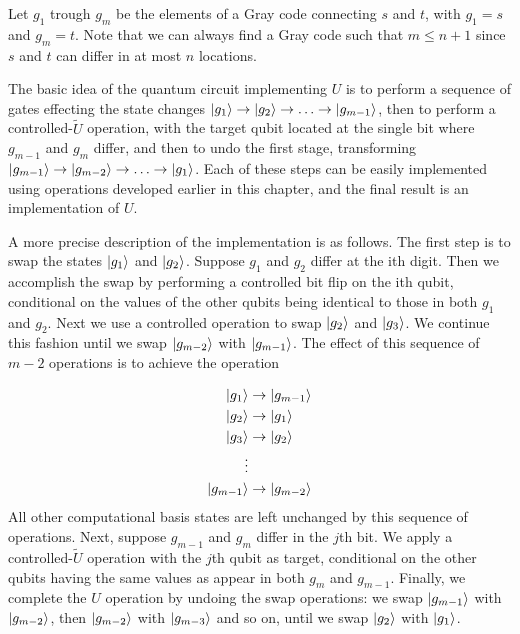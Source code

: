 Let $g_1$ trough $g_m$ be the elements of a Gray code connecting $s$ and $t$, with $g_1=s$ and $g_m=t$. Note that we can always find a Gray code such that $m\leq n+1$ since $s$ and $t$ can differ in at most $n$ locations.

The basic idea of the quantum circuit implementing $U$ is to perform a sequence of gates effecting the state changes $\ket{g_1}\rightarrow \ket{g_2} \rightarrow \ldots \rightarrow \ket{g_{m-1}}$, then to perform a controlled-$\tilde{U}$ operation, with the target qubit located at the single bit where $g_{m-1}$ and $g_m$ differ, and then to undo the first stage, transforming $\ket{g_{m-1}}\rightarrow\ket{g_{m-2}}\rightarrow \ldots \rightarrow \ket{g_1}$. Each of these steps can be easily implemented using operations developed earlier in this chapter, and the final result is an implementation of $U$.

A more precise description of the implementation is as follows. The first step is to swap the states $\ket{g_1}$ and $\ket{g_2}$. Suppose $g_1$ and $g_2$ differ at the ith digit. Then we accomplish the swap by performing a controlled bit flip on the ith qubit, conditional on the values of the other qubits being identical to those in both $g_1$ and $g_2$. Next we use a controlled operation to swap $\ket{g_2}$ and $\ket{g_3}$. We continue this fashion until we swap $\ket{g_{m-2}}$ with $\ket{g_{m-1}}$. The effect of this sequence of $m-2$ operations is to achieve the operation

\begin{align*}
    \ket{g_1} &\rightarrow \ket{g_{m-1}}\\
    \ket{g_2} &\rightarrow \ket{g_1}\\
    \ket{g_3} &\rightarrow \ket{g_2}\\
    \vdots \\
    \ket{g_{m-1}} &\rightarrow \ket{g_{m-2}}
\end{align*}
All other computational basis states are left unchanged by this sequence of operations. Next, suppose $g_{m-1}$ and $g_{m}$ differ in the $j$th bit. We apply a controlled-$\tilde{U}$ operation with the $j$th qubit as target, conditional on the other qubits having the same values as appear in both $g_m$ and $g_{m-1}$. Finally, we complete the $U$ operation by undoing the swap operations: we swap $\ket{g_{m-1}}$ with $\ket{g_{m-2}}$, then $\ket{g_{m-2}}$ with $\ket{g_{m-3}}$ and so on, until we swap $\ket{g_2}$ with $\ket{g_1}$.

